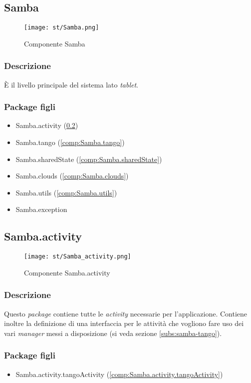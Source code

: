 \subsection{Samba}\label{comp:Samba}
\begin{figure}[H] 
    \centering 
    \texttt{[image: st/Samba.png]} 
    \caption{Componente Samba}\label{fig:comp-Samba}
\end{figure}
\subsubsection{Descrizione}
È il livello principale del sistema lato \emph{tablet}.
\subsubsection{Package figli}
\begin{itemize}
	\item Samba.activity (\ref{comp:Samba.activity})
	\item Samba.tango (\ref{comp:Samba.tango})
	\item Samba.sharedState (\ref{comp:Samba.sharedState})
	\item Samba.clouds (\ref{comp:Samba.clouds})
	\item Samba.utils (\ref{comp:Samba.utils})
	\item Samba.exception
\end{itemize}

\newpage
\subsection{Samba.activity}\label{comp:Samba.activity}
\begin{figure}[H] 
    \centering 
    \texttt{[image: st/Samba\_activity.png]} 
    \caption{Componente Samba.activity}
\end{figure}
\subsubsection{Descrizione}
Questo \emph{package} contiene tutte le \emph{activity} necessarie per l'applicazione. Contiene inoltre la definizione di una interfaccia per le attività che vogliono fare uso dei vari \emph{manager} messi a disposizione (si veda sezione \ref{subs:samba-tango}).
\subsubsection{Package figli}
\begin{itemize}
	\item Samba.activity.tangoActivity (\ref{comp:Samba.activity.tangoActivity})
\end{itemize}
